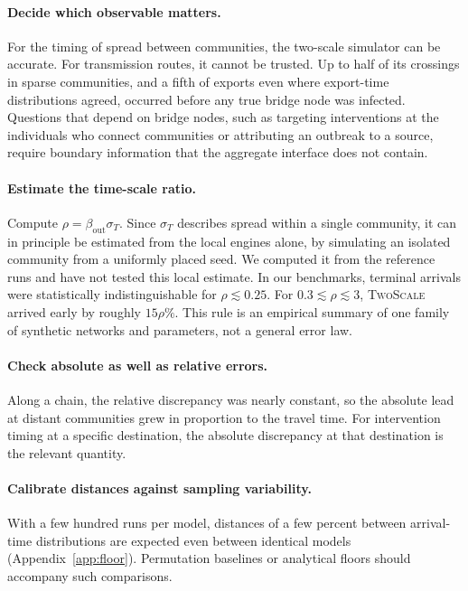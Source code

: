 \documentclass[a4paper,fleqn]{cas-sc}
\newcommand{\TS}{\textup{\textsc{TwoScale}}}
\begin{document}
\paragraph{Decide which observable matters.}
For the timing of spread between communities, the two-scale simulator can be accurate. For transmission routes, it cannot be trusted. Up to half of its crossings in sparse communities, and a fifth of exports even where export-time distributions agreed, occurred before any true bridge node was infected. Questions that depend on bridge nodes, such as targeting interventions at the individuals who connect communities or attributing an outbreak to a source, require boundary information that the aggregate interface does not contain.

\paragraph{Estimate the time-scale ratio.}
Compute $\rho=\beta_{\mathrm{out}}\sigma_T$. Since $\sigma_T$ describes spread within a single community, it can in principle be estimated from the local engines alone, by simulating an isolated community from a uniformly placed seed. We computed it from the reference runs and have not tested this local estimate. In our benchmarks, terminal arrivals were statistically indistinguishable for $\rho\lesssim0.25$. For $0.3\lesssim\rho\lesssim3$, \TS{} arrived early by roughly $15\rho\%$. This rule is an empirical summary of one family of synthetic networks and parameters, not a general error law.

\paragraph{Check absolute as well as relative errors.}
Along a chain, the relative discrepancy was nearly constant, so the absolute lead at distant communities grew in proportion to the travel time. For intervention timing at a specific destination, the absolute discrepancy at that destination is the relevant quantity.

\paragraph{Calibrate distances against sampling variability.}
With a few hundred runs per model, distances of a few percent between arrival-time distributions are expected even between identical models (Appendix~\ref{app:floor}). Permutation baselines or analytical floors should accompany such comparisons.
\end{document}
